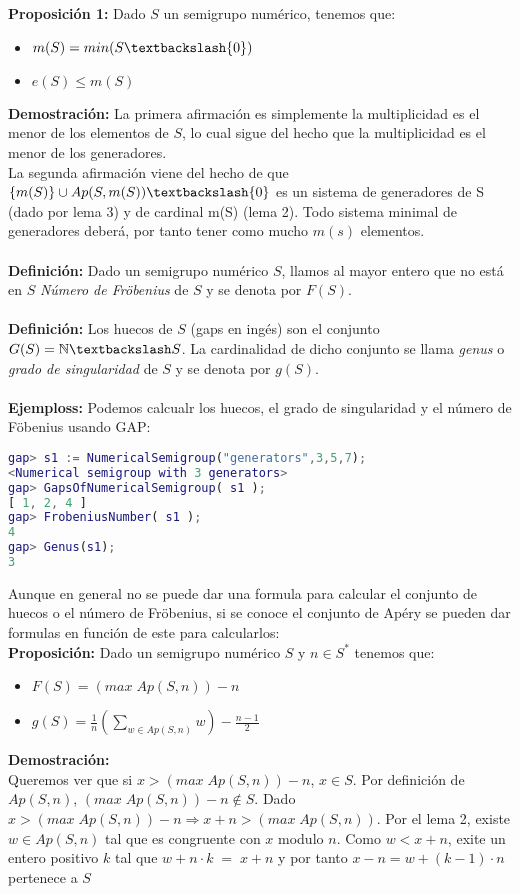 \documentclass[10pt,spanish]{book}
\begin{document}
\textbf{Proposición 1:} Dado $S$ un semigrupo numérico, tenemos que:
\begin{itemize}
	\item $m(S) = min(S\textbackslash \{0\})$
	\item $e(S)\leq m(S)$
\end{itemize} 
\textbf{Demostración:} La primera afirmación es simplemente la multiplicidad es el menor de los elementos de $S$, lo cual sigue del hecho que la multiplicidad es el menor de los generadores. \\
La segunda afirmación viene del hecho de que $\{m(S)\}\cup Ap(S,m(S))\textbackslash\{0\}$ es un sistema de generadores de S (dado por lema 3) y de cardinal m(S) (lema 2). Todo sistema minimal de generadores deberá, por tanto tener como mucho $m(s)$ elementos.\\
\\ \textbf{Definición:} Dado un semigrupo numérico $S$, llamos al mayor entero que no está en $S$ \textit{Número de Fröbenius} de $S$ y se denota por $F(S)$. \\
\\ \textbf{Definición:} Los huecos de $S$ (gaps en ingés) son el conjunto $G(S)=\mathbb{N}\textbackslash S$. La cardinalidad de dicho conjunto se llama \textit{genus} o \textit{grado de singularidad} de $S$ y se denota por $g(S)$.\\
\\ \textbf{Ejemploss: } Podemos calcualr los huecos, el grado de singularidad y el número de Föbenius usando GAP:
\begin{lstlisting}[language=gap]
gap> s1 := NumericalSemigroup("generators",3,5,7);
<Numerical semigroup with 3 generators>
gap> GapsOfNumericalSemigroup( s1 );
[ 1, 2, 4 ]
gap> FrobeniusNumber( s1 );
4
gap> Genus(s1);
3
\end{lstlisting}
Aunque en general no se puede dar una formula para calcular el conjunto de huecos o el número de Fröbenius, si se conoce el conjunto de Apéry se pueden dar formulas en función de este para calcularlos:\\
\textbf{Proposición:} Dado un semigrupo numérico $S$ y $n\in S^{*}$ tenemos que:
\begin{itemize}
\item $F(S)=(max\;Ap(S,n))-n$
\item $g(S)=\frac{1}{n}(\sum_{w\in Ap(S,n)} w)-\frac{n-1}{2}$
\end{itemize}
\textbf{Demostración:}\\
Queremos ver que si $x>(max\;Ap(S,n))-n$, $x\in S$. Por definición de $Ap(S,n)$, $(max\;Ap(S,n))-n \notin S$. Dado $x>(max\;Ap(S,n))-n\Rightarrow x+n>(max\;Ap(S,n))$. Por el lema 2, existe $w\in Ap(S,n)$ tal que es congruente con $x$ modulo $n$. Como $w<x+n$, exite un entero positivo $k$ tal que $w+n\cdot k\;=\; x+n $ y por tanto $x-n=w+(k-1)\cdot n$ pertenece a $S$\\
\end{document}
